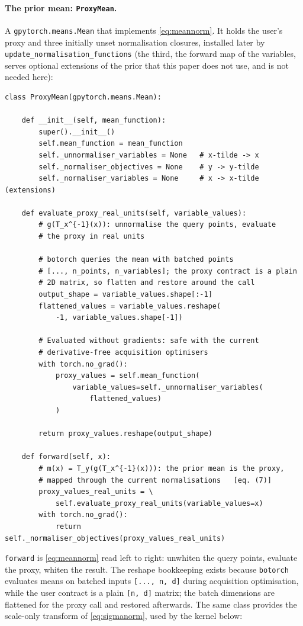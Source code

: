 \documentclass[11pt,a4paper]{article}
\newcommand{\code}[1]{\texttt{#1}}
\begin{document}
\paragraph{The prior mean: \code{ProxyMean}.} A \code{gpytorch.means.Mean}
that implements \eqref{eq:meannorm}. It holds the user's proxy and three
initially unset normalisation closures, installed later by
\code{update\_normalisation\_functions} (the third, the forward map of the
variables, serves optional extensions of the prior that this paper does not
use, and is not needed here):

\begin{lstlisting}
class ProxyMean(gpytorch.means.Mean):

    def __init__(self, mean_function):
        super().__init__()
        self.mean_function = mean_function
        self._unnormaliser_variables = None   # x-tilde -> x
        self._normaliser_objectives = None    # y -> y-tilde
        self._normaliser_variables = None     # x -> x-tilde (extensions)

    def evaluate_proxy_real_units(self, variable_values):
        # g(T_x^{-1}(x)): unnormalise the query points, evaluate
        # the proxy in real units

        # botorch queries the mean with batched points
        # [..., n_points, n_variables]; the proxy contract is a plain
        # 2D matrix, so flatten and restore around the call
        output_shape = variable_values.shape[:-1]
        flattened_values = variable_values.reshape(
            -1, variable_values.shape[-1])

        # Evaluated without gradients: safe with the current
        # derivative-free acquisition optimisers
        with torch.no_grad():
            proxy_values = self.mean_function(
                variable_values=self._unnormaliser_variables(
                    flattened_values)
            )

        return proxy_values.reshape(output_shape)

    def forward(self, x):
        # m(x) = T_y(g(T_x^{-1}(x))): the prior mean is the proxy,
        # mapped through the current normalisations   [eq. (7)]
        proxy_values_real_units = \
            self.evaluate_proxy_real_units(variable_values=x)
        with torch.no_grad():
            return self._normaliser_objectives(proxy_values_real_units)
\end{lstlisting}

\code{forward} is \eqref{eq:meannorm} read left to right: unwhiten the query
points, evaluate the proxy, whiten the result. The reshape bookkeeping exists
because \code{botorch} evaluates means on batched inputs
\code{[..., n, d]} during acquisition optimisation, while the user contract
is a plain \code{[n, d]} matrix; the batch dimensions are flattened for the
proxy call and restored afterwards. The same class provides the scale-only
transform of \eqref{eq:sigmanorm}, used by the kernel below:
\end{document}
